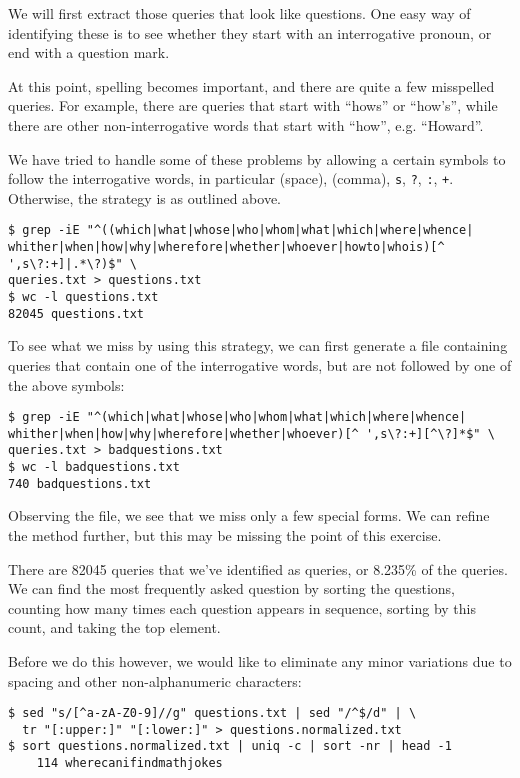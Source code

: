 \begin{itemize}
We will first extract those queries that look like questions. One easy way of
identifying these is to see whether they start with an interrogative pronoun,
or end with a question mark.

At this point, spelling becomes important, and there are quite a few misspelled
queries. For example, there are queries that start with ``hows'' or ``how's'',
while there are other non-interrogative words that start with ``how'', e.g.
``Howard''.

We have tried to handle some of these problems by allowing a certain symbols to
follow the interrogative words, in particular (space), (comma), \texttt{s},
\texttt{?}, \texttt{:}, \texttt{+}. Otherwise, the strategy is as outlined
above.

\begin{lstlisting}
$ grep -iE "^((which|what|whose|who|whom|what|which|where|whence|
whither|when|how|why|wherefore|whether|whoever|howto|whois)[^ ',s\?:+]|.*\?)$" \
queries.txt > questions.txt
$ wc -l questions.txt 
82045 questions.txt
\end{lstlisting}

To see what we miss by using this strategy, we can first generate a file
containing queries that contain one of the interrogative words, but are not
followed by one of the above symbols:

\begin{lstlisting}
$ grep -iE "^(which|what|whose|who|whom|what|which|where|whence|
whither|when|how|why|wherefore|whether|whoever)[^ ',s\?:+][^\?]*$" \
queries.txt > badquestions.txt
$ wc -l badquestions.txt 
740 badquestions.txt
\end{lstlisting}

Observing the file, we see that we miss only a few special forms. We can refine
the method further, but this may be missing the point of this exercise.

There are 82045 queries that we've identified as queries, or 8.235\% of the
queries. We can find the most frequently asked question by sorting the
questions, counting how many times each question appears in sequence, sorting
by this count, and taking the top element.

Before we do this however, we would like to eliminate any minor variations due
to spacing and other non-alphanumeric characters:

\begin{lstlisting}
$ sed "s/[^a-zA-Z0-9]//g" questions.txt | sed "/^$/d" | \
  tr "[:upper:]" "[:lower:]" > questions.normalized.txt
$ sort questions.normalized.txt | uniq -c | sort -nr | head -1
    114 wherecanifindmathjokes
\end{lstlisting}


\end{itemize}
